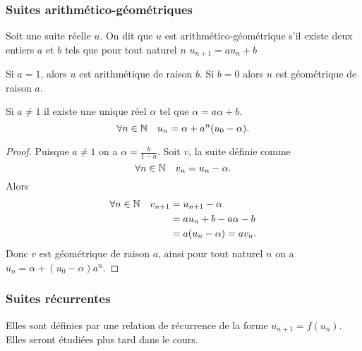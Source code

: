 \subsubsection{Suites arithmético-géométriques}

\begin{defdef}
  Soit une suite réelle $u$. On dit que $u$ est arithmético-géométrique s'il existe deux entiers $a$ et $b$ tels que pour tout naturel $n$ $u_{n+1}=au_n +b$
\end{defdef}

Si $a=1$, alors $u$ est arithmétique de raison $b$. Si $b=0$ alors $u$ est géométrique de raison $a$.

\begin{prop}
  Si $a\neq 1$ il existe une unique réel $\alpha$ tel que $\alpha=a\alpha+b$. %
  \begin{equation}
    \forall n \in \mathbb{N} \quad u_n=\alpha + a^{n}(u_0-\alpha).
  \end{equation}
\end{prop}
\begin{proof}
  Puisque $a \neq 1$ on a $\alpha = \frac{b}{1-a}$. Soit $v$, la suite définie comme
  \begin{equation}
    \forall n \in \mathbb{N} \quad v_n = u_n -\alpha.
  \end{equation}
Alors
\begin{align}
  \forall n \in \mathbb{N} \quad v_{n+1}&=u_{n+1}-\alpha \\
  &= a u_n +b - a\alpha -b \\
  &= a(u_n-\alpha)=a v_n.
\end{align}
Donc $v$ est géométrique de raison $a$, ainsi pour tout naturel $n$ on a $u_n=\alpha + (u_0-\alpha)a^n$.
\end{proof}

\subsubsection{Suites récurrentes}

Elles sont définies par une relation de récurrence de la forme $u_{n+1}=f(u_n)$. Elles seront étudiées plus tard dans le cours.

